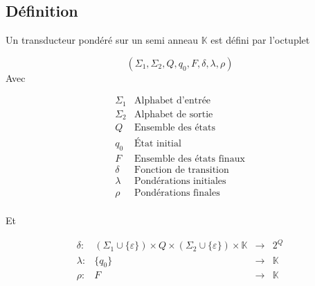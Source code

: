 \documentclass[a4paper, 12pt, fleqn]{article}
\newcommand\K{\mathbb{K}}
\begin{document}
\subsection{Définition}
\label{sec:definition-1}

Un transducteur pondéré sur un semi anneau $\K$ est défini par
l'octuplet

\begin{equation*}
  (\Sigma_1, \Sigma_2, Q, q_0, F, \delta, \lambda, \rho)
\end{equation*}
Avec

\begin{equation*}
  \begin{array}{r|l}
    \Sigma_1 & \text{Alphabet d'entrée}         \\
    \Sigma_2 & \text{Alphabet de sortie}        \\
    Q        & \text{Ensemble des états}        \\
    q_0      & \text{État initial}              \\
    F        & \text{Ensemble des états finaux} \\
    \delta   & \text{Fonction de transition}    \\
    \lambda  & \text{Pondérations initiales}    \\
    \rho     & \text{Pondérations finales}      \\
  \end{array}
\end{equation*}

Et

\begin{equation*}
  \begin{array}{llll}
    \delta:  & (\Sigma_1 \cup \{\varepsilon\})
    \times Q
    \times (\Sigma_2 \cup \{\varepsilon\})
    \times \mathbb{K}
             & \rightarrow & 2^Q                      \\
    \lambda: & \{q_0\}     & \rightarrow & \mathbb{K} \\
    \rho:    & F           & \rightarrow & \mathbb{K} \\

  \end{array}
\end{equation*}
\end{document}

